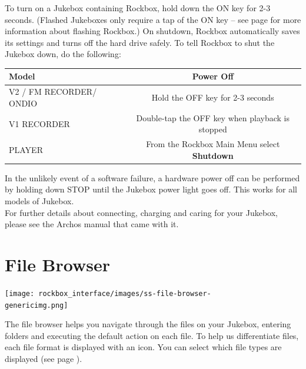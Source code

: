 To turn on a Jukebox containing Rockbox, hold down the ON key
for 2{}-3 seconds.  (Flashed Jukeboxes only require a tap of the ON key
{--} see page \textup{\pageref{ref:FlashingRockboxReal}} for more
information about flashing Rockbox.) 
\label{ref:Safeshutdown}On shutdown, Rockbox automatically saves its settings and turns off the hard drive safely. To tell Rockbox to shut the Jukebox down, do the following:

\begin{table}[h!]
  \begin{center}
    \begin{tabular}{@{}lc@{}}\toprule
      \textbf{Model} & \textbf{Power Off} \\\midrule
      V2 / FM RECORDER/ ONDIO & Hold  the OFF key for 2{}-3 seconds \\
      V1 RECORDER & Double{}-tap the OFF key when playback is stopped \\
      PLAYER & From the Rockbox Main Menu select \textbf{Shutdown} \\\bottomrule
    \end{tabular}
  \end{center}
\end{table}

In the unlikely event of a software failure, a hardware power off can be
performed by holding down STOP until the Jukebox power light goes off. 
This works for all models of Jukebox.\\

For further details about connecting, charging and caring for your
Jukebox, please see the Archos manual that came with it.

\section{\label{ref:PartIIFB}File Browser}
\begin{center}
  \texttt{[image: rockbox\_interface/images/ss-file-browser-\\genericimg.png]}
\end{center}

The file browser helps you navigate through the files on your Jukebox,
entering folders and executing the default action on each file. To help
us differentiate files, each file format is displayed with an icon. You
can select which file types are displayed (see page
\pageref{ref:ShowFiles}).

